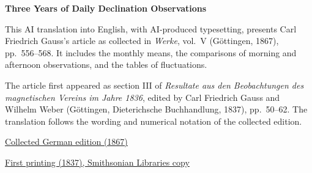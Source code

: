 \clearpage
\thispagestyle{empty}
\begin{center}\Large\textbf{Three Years of Daily Declination Observations}\end{center}

This AI translation into English, with AI-produced typesetting, presents Carl Friedrich Gauss’s article as collected in \textit{Werke}, vol.~V (Göttingen, 1867), pp.~556--568. It includes the monthly means, the comparisons of morning and afternoon observations, and the tables of fluctuations.

The article first appeared as section III of \textit{Resultate aus den Beobachtungen des magnetischen Vereins im Jahre 1836}, edited by Carl Friedrich Gauss and Wilhelm Weber (Göttingen, Dieterichsche Buchhandlung, 1837), pp.~50--62. The translation follows the wording and numerical notation of the collected edition.

\medskip\noindent
\href{https://gdz.sub.uni-goettingen.de/id/PPN236006339}{Collected German edition (1867)}\par
\noindent\href{https://archive.org/details/ResultateausdenBd1Gaus/page/n55/mode/2up}{First printing (1837), Smithsonian Libraries copy}
\clearpage
